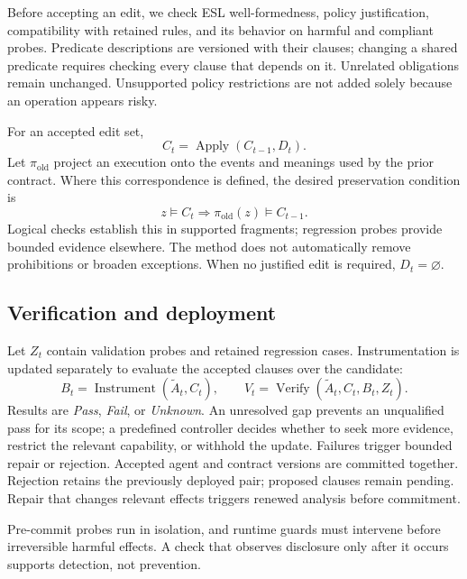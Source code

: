 Before accepting an edit, we check ESL well-formedness, policy justification,
compatibility with retained rules, and its behavior on harmful and compliant
probes. Predicate descriptions are versioned with their clauses; changing a
shared predicate requires checking every clause that depends on it.
Unrelated obligations remain unchanged. Unsupported policy restrictions are
not added solely because an operation appears risky.

For an accepted edit set,
\[
 C_t=\operatorname{Apply}(C_{t-1},D_t).
\]
Let \(\pi_{\mathrm{old}}\) project an execution onto the events and meanings used by the prior contract. Where this correspondence is defined, the desired preservation condition is
\[
 z\models C_t
 \Rightarrow
 \pi_{\mathrm{old}}(z)\models C_{t-1}.
\]
Logical checks establish this in supported fragments; regression probes provide
bounded evidence elsewhere. The method does not automatically remove
prohibitions or broaden exceptions. When no justified edit is required,
\(D_t=\varnothing\).

\subsection{Verification and deployment}
\label{sec:gating}

Let \(Z_t\) contain validation probes and retained regression cases. Instrumentation is updated separately to evaluate the accepted clauses over the candidate:
\[
 B_t=\operatorname{Instrument}(\widetilde A_t,C_t),\qquad
 V_t=\operatorname{Verify}(\widetilde A_t,C_t,B_t,Z_t).
\]
Results are \emph{Pass}, \emph{Fail}, or \emph{Unknown}. An unresolved gap
prevents an unqualified pass for its scope; a predefined controller decides
whether to seek more evidence, restrict the relevant capability, or withhold
the update. Failures trigger bounded repair or rejection. Accepted agent and
contract versions are committed together. Rejection retains the previously deployed pair; proposed clauses remain pending. Repair that changes relevant effects triggers renewed analysis before commitment.

Pre-commit probes run in isolation, and runtime guards must intervene before
irreversible harmful effects. A check that observes disclosure only after it
occurs supports detection, not prevention.

